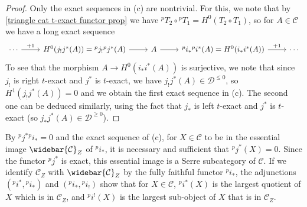 \begin{proof}
Only the exact sequences in (c) are nontrivial. For this, we note that by \cref{triangle cat t-exact functor prop} we have ${^pT_2}\circ{^pT_1}=H^0(T_2\circ T_1)$, so for $A\in\mathcal{C}$ we have a long exact sequence
\[\begin{tikzcd}
\cdots\ar[r,"+1"]&H^0(j_!j^*(A))={^pj_!}{^pj^*}(A)\ar[r]&A\ar[r]&{^pi_*}{^pi^*}(A)=H^0(i_*i^*(A))\ar[r,"+1"]&\cdots
\end{tikzcd}\]
To see that the morphism $A\to H^0(i_*i^*(A))$ is surjective, we note that since $j_!$ is right $t$-exact and $j^*$ is $t$-exact, we have $j_!j^*(A)\in\mathcal{D}^{\leq 0}$, so $H^1(j_!j^*(A))=0$ and we obtain the first exact sequence in (c). The second one can be deduced similarly, using the fact that $j_*$ is left $t$-exact and $j^*$ is $t$-exact (so $j_*j^*(A)\in\mathcal{D}^{\geq 0}$).
\end{proof}

\begin{remark}\label{triangle cat recollement ^pi_* adjoint char}
By ${^pj^*}{^pi_*}=0$ and the exact sequence of (c), for $X\in\mathcal{C}$ to be in the essential image $\widebar{\mathcal{C}}_Z$ of ${^pi_*}$, it is necessary and sufficient that ${^pj^*}(X)=0$. Since the functor ${^pj^*}$ is exact, this essential image is a Serre subcategory of $\mathcal{C}$. If we identify $\mathcal{C}_Z$ with $\widebar{\mathcal{C}}_Z$ by the fully faithful functor ${^pi_*}$, the adjunctions $({^pi^*},{^pi_*})$ and $({^pi_*},{^pi_!})$ show that for $X\in\mathcal{C}$, ${^pi^*}(X)$ is the largest quotient of $X$ which is in $\mathcal{C}_Z$, and ${^pi^!}(X)$ is the largest sub-object of $X$ that is in $\mathcal{C}_Z$.
\end{remark}

